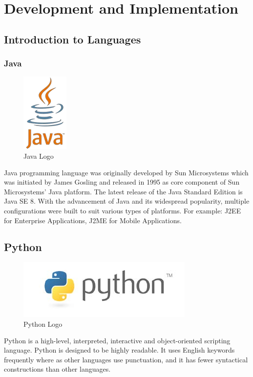 \section{Development and Implementation}
\subsection{Introduction to Languages}
\subsubsection{Java}
\begin{figure}[ht]
\centering
\includegraphics[scale=0.5]{input/images/java.png}
\caption{Java Logo}
\end{figure}
Java programming language was originally developed by Sun Microsystems which was initiated by James
Gosling and released in 1995 as core component of Sun Microsystems' Java platform. The latest release of
the Java Standard Edition is Java SE 8. With the advancement of Java and its widespread popularity,
multiple configurations were built to suit various types of platforms. For example: J2EE for Enterprise
Applications, J2ME for Mobile Applications.


\subsection{Python}

\begin{figure}[ht]
\centering
\includegraphics[scale=0.5]{input/images/py.png}
\caption{Python Logo}
\end{figure}
Python is a high-level, interpreted, interactive and object-oriented scripting language. Python is designed
to be highly readable. It uses English keywords frequently where as other languages use punctuation, and
it has fewer syntactical constructions than other languages.
